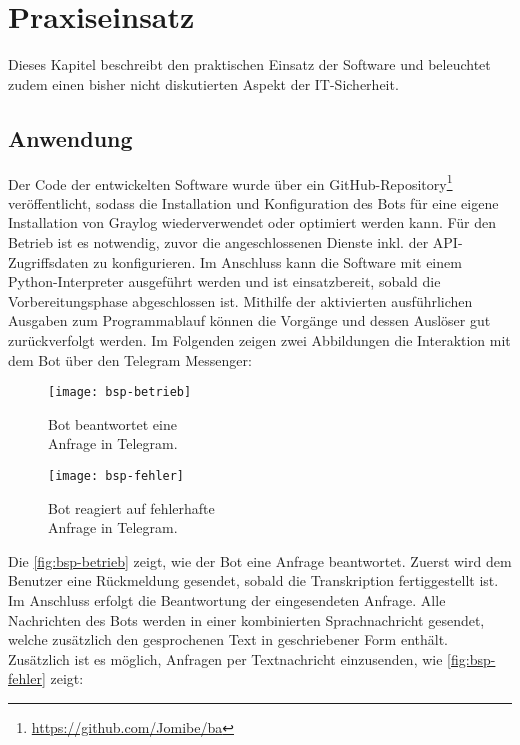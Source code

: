 \chapter{Praxiseinsatz}
\label{cha:praxiseinsatz}

Dieses Kapitel beschreibt den praktischen Einsatz der Software und beleuchtet zudem einen bisher nicht diskutierten Aspekt der IT-Sicherheit.

\section{Anwendung}

Der Code der entwickelten Software wurde über ein GitHub-Repository\footnote{\url{https://github.com/Jomibe/ba}} veröffentlicht, sodass die Installation und Konfiguration des Bots für eine eigene Installation von Graylog wiederverwendet oder optimiert werden kann. Für den Betrieb ist es notwendig, zuvor die angeschlossenen Dienste inkl. der API-Zugriffsdaten zu konfigurieren. Im Anschluss kann die Software mit einem Python-Interpreter ausgeführt werden und ist einsatzbereit, sobald die Vorbereitungsphase abgeschlossen ist. Mithilfe der aktivierten ausführlichen Ausgaben zum Programmablauf können die Vorgänge und dessen Auslöser gut zurückverfolgt werden. Im Folgenden zeigen zwei Abbildungen die Interaktion mit dem Bot über den Telegram Messenger:

\begin{figure}[h!]
    \centering
    \begin{minipage}{0.5\textwidth}
        \raggedright
        \texttt{[image: bsp-betrieb]}
        \caption{Bot beantwortet eine \\\hspace{\textwidth}Anfrage in Telegram.}
        \label{fig:bsp-betrieb}
    \end{minipage}\hfill
    \begin{minipage}{0.5\textwidth}
        \raggedleft
        \texttt{[image: bsp-fehler]}
        \caption{Bot reagiert auf fehlerhafte \\\hspace{\textwidth}Anfrage in Telegram.}
        \label{fig:bsp-fehler}
    \end{minipage}
\end{figure}

Die \autoref{fig:bsp-betrieb} zeigt, wie der Bot eine Anfrage beantwortet. Zuerst wird dem Benutzer eine Rückmeldung gesendet, sobald die Transkription fertiggestellt ist. Im Anschluss erfolgt die Beantwortung der eingesendeten Anfrage. Alle Nachrichten des Bots werden in einer kombinierten Sprachnachricht gesendet, welche zusätzlich den gesprochenen Text in geschriebener Form enthält. Zusätzlich ist es möglich, Anfragen per Textnachricht einzusenden, wie \autoref{fig:bsp-fehler} zeigt:

